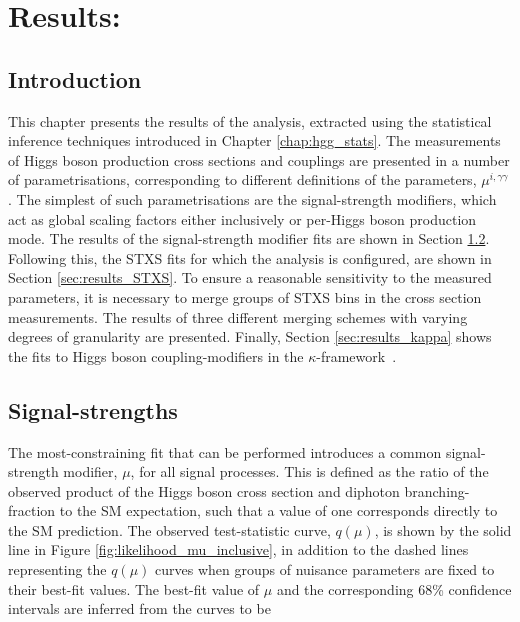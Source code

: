 \chapter{Results: \Hgg}
\label{chap:hgg_results}

\section{Introduction}
This chapter presents the results of the \Hgg analysis, extracted using the statistical inference techniques introduced in Chapter \ref{chap:hgg_stats}. The measurements of Higgs boson production cross sections and couplings are presented in a number of parametrisations, corresponding to different definitions of the parameters, $\mu^{i,\gamma\gamma}$. The simplest of such parametrisations are the signal-strength modifiers, which act as global scaling factors either inclusively or per-Higgs boson production mode. The results of the signal-strength modifier fits are shown in Section \ref{sec:results_mu}. Following this, the STXS fits for which the analysis is configured, are shown in Section \ref{sec:results_STXS}. To ensure a reasonable sensitivity to the measured parameters, it is necessary to merge groups of STXS bins in the cross section measurements. The results of three different merging schemes with varying degrees of granularity are presented. Finally, Section \ref{sec:results_kappa} shows the fits to Higgs boson coupling-modifiers in the $\kappa$-framework~\cite{Heinemeyer:2013tqa}.

\section{Signal-strengths}\label{sec:results_mu}
The most-constraining fit that can be performed introduces a common signal-strength modifier, $\mu$, for all signal processes. This is defined as the ratio of the observed product of the Higgs boson cross section and diphoton branching-fraction to the SM expectation, such that a value of one corresponds directly to the SM prediction. The observed test-statistic curve, $q(\mu)$, is shown by the solid line in Figure \ref{fig:likelihood_mu_inclusive}, in addition to the dashed lines representing the $q(\mu)$ curves when groups of nuisance parameters are fixed to their best-fit values. The best-fit value of $\mu$ and the corresponding 68\% confidence intervals are inferred from the curves to be

